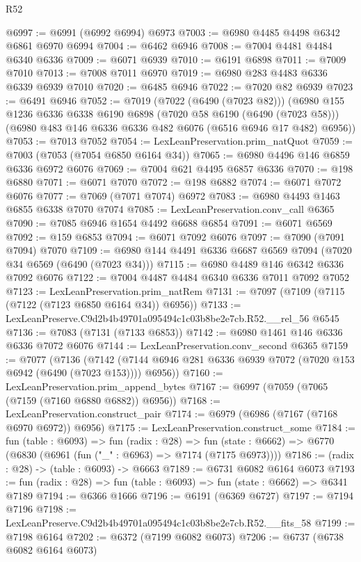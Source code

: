 \begin{lexlean}{R52}
\begin{coremodule}
@6997 := @6991 (@6992 @6994) @6973
@7003 := @6980 @4485 @4498 @6342 @6861 @6970 @6994
@7004 := @6462 @6946
@7008 := @7004 @4481 @4484 @6340 @6336
@7009 := @6071 @6939
@7010 := @6191 @6898
@7011 := @7009 @7010
@7013 := @7008 @7011 @6970
@7019 := @6980 @283 @4483 @6336 @6339 @6939 @7010
@7020 := @6485 @6946
@7022 := @7020 @82 @6939
@7023 := @6491 @6946
@7052 := @7019
    (@7022 (@6490 (@7023 @82)))
    (@6980
      @155
      @1236
      @6336
      @6338
      @6190
      @6898
      (@7020 @58 @6190 (@6490 (@7023 @58)))
      (@6980 @483 @146 @6336 @6336 @482 @6076 (@6516 @6946 @17 @482) @6956))
@7053 := @7013 @7052
@7054 := LexLeanPreservation.prim_natQuot
@7059 := @7003 (@7053 (@7054 @6850 @6164 @34))
@7065 := @6980 @4496 @146 @6859 @6336 @6972 @6076
@7069 := @7004 @621 @4495 @6857 @6336
@7070 := @198 @6880
@7071 := @6071 @7070
@7072 := @198 @6882
@7074 := @6071 @7072 @6076
@7077 := @7069 (@7071 @7074) @6972
@7083 := @6980 @4493 @1463 @6855 @6338 @7070 @7074
@7085 := LexLeanPreservation.conv_call @6365
@7090 := @7085 @6946 @1654 @4492 @6688 @6854
@7091 := @6071 @6569
@7092 := @159 @6853
@7094 := @6071 @7092 @6076
@7097 := @7090 (@7091 @7094) @7070
@7109 := @6980 @144 @4491 @6336 @6687 @6569 @7094 (@7020 @34 @6569 (@6490 (@7023 @34)))
@7115 := @6980 @4489 @146 @6342 @6336 @7092 @6076
@7122 := @7004 @4487 @4484 @6340 @6336 @7011 @7092 @7052
@7123 := LexLeanPreservation.prim_natRem
@7131 := @7097 (@7109 (@7115 (@7122 (@7123 @6850 @6164 @34)) @6956))
@7133 := LexLeanPreserve.C9d2b4b49701a095494c1c03b8be2e7cb.R52.__rel_56 @6545
@7136 := @7083 (@7131 (@7133 @6853))
@7142 := @6980 @1461 @146 @6336 @6336 @7072 @6076
@7144 := LexLeanPreservation.conv_second @6365
@7159 := @7077
    (@7136
      (@7142 (@7144 @6946 @281 @6336 @6939 @7072 (@7020 @153 @6942 (@6490 (@7023 @153)))) @6956))
@7160 := LexLeanPreservation.prim_append_bytes
@7167 := @6997 (@7059 (@7065 (@7159 (@7160 @6880 @6882)) @6956))
@7168 := LexLeanPreservation.construct_pair
@7174 := @6979 (@6986 (@7167 (@7168 @6970 @6972)) @6956)
@7175 := LexLeanPreservation.construct_some
@7184 := fun (table : @6093) =>
  fun (radix : @28) =>
  fun (state : @6662) => @6770 (@6830 (@6961 (fun ("_" : @6963) => @7174 (@7175 @6973))))
@7186 := (radix : @28) -> (table : @6093) -> @6663
@7189 := @6731 @6082 @6164 @6073
@7193 := fun (radix : @28) => fun (table : @6093) => fun (state : @6662) => @6341 @7189
@7194 := @6366 @1666
@7196 := @6191 (@6369 @6727)
@7197 := @7194 @7196
@7198 := LexLeanPreserve.C9d2b4b49701a095494c1c03b8be2e7cb.R52.__fits_58
@7199 := @7198 @6164
@7202 := @6372 (@7199 @6082 @6073)
@7206 := @6737 (@6738 @6082 @6164 @6073)

\end{coremodule}
\end{lexlean}
